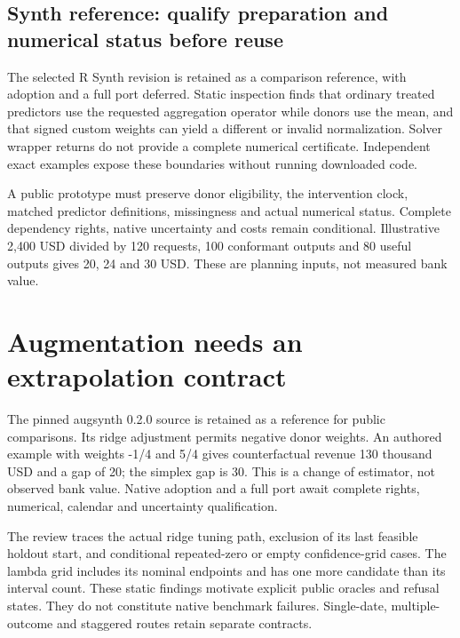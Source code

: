 \hypertarget{synth-reference-qualify-preparation-and-numerical-status-before-reuse}{%
\subsection{Synth reference: qualify preparation and numerical status
before
reuse}\label{synth-reference-qualify-preparation-and-numerical-status-before-reuse}}

The selected R Synth revision is retained as a comparison reference,
with adoption and a full port deferred. Static inspection finds that
ordinary treated predictors use the requested aggregation operator while
donors use the mean, and that signed custom weights can yield a
different or invalid normalization. Solver wrapper returns do not
provide a complete numerical certificate. Independent exact examples
expose these boundaries without running downloaded code.
\citep{exec24_synth_source,exec24_synth_choice}

A public prototype must preserve donor eligibility, the intervention
clock, matched predictor definitions, missingness and actual numerical
status. Complete dependency rights, native uncertainty and costs remain
conditional. Illustrative 2,400 USD divided by 120 requests, 100
conformant outputs and 80 useful outputs gives 20, 24 and 30 USD. These
are planning inputs, not measured bank value.
\citep{exec24_synth_choice}

\hypertarget{augmentation-needs-an-extrapolation-contract}{%
\section{Augmentation needs an extrapolation
contract}\label{augmentation-needs-an-extrapolation-contract}}

The pinned augsynth 0.2.0 source is retained as a reference for public
comparisons. Its ridge adjustment permits negative donor weights. An
authored example with weights -1/4 and 5/4 gives counterfactual revenue
130 thousand USD and a gap of 20; the simplex gap is 30. This is a
change of estimator, not observed bank value. Native adoption and a full
port await complete rights, numerical, calendar and uncertainty
qualification. \citep{exec24_augsynth_source,exec24_augsynth_choice}

The review traces the actual ridge tuning path, exclusion of its last
feasible holdout start, and conditional repeated-zero or empty
confidence-grid cases. The lambda grid includes its nominal endpoints
and has one more candidate than its interval count. These static
findings motivate explicit public oracles and refusal states. They do
not constitute native benchmark failures. Single-date, multiple-outcome
and staggered routes retain separate contracts.
\citep{exec24_augsynth_source}

